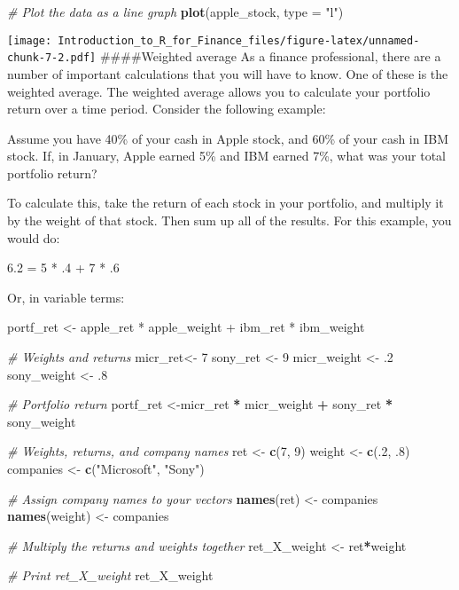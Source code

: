 \documentclass[]{article}
\newenvironment{Shaded}{\begin{snugshade}}{\end{snugshade}}
\newcommand{\KeywordTok}[1]{\textcolor[rgb]{0.13,0.29,0.53}{\textbf{#1}}}
\newcommand{\DataTypeTok}[1]{\textcolor[rgb]{0.13,0.29,0.53}{#1}}
\newcommand{\DecValTok}[1]{\textcolor[rgb]{0.00,0.00,0.81}{#1}}
\newcommand{\StringTok}[1]{\textcolor[rgb]{0.31,0.60,0.02}{#1}}
\newcommand{\CommentTok}[1]{\textcolor[rgb]{0.56,0.35,0.01}{\textit{#1}}}
\newcommand{\OperatorTok}[1]{\textcolor[rgb]{0.81,0.36,0.00}{\textbf{#1}}}
\newcommand{\NormalTok}[1]{#1}
\begin{document}
\begin{Shaded}
\begin{Highlighting}[]
\CommentTok{# Plot the data as a line graph}
\KeywordTok{plot}\NormalTok{(apple_stock, }\DataTypeTok{type =} \StringTok{"l"}\NormalTok{)}
\end{Highlighting}
\end{Shaded}

\texttt{[image: Introduction\_to\_R\_for\_Finance\_files/figure-latex/unnamed-chunk-7-2.pdf]}
\#\#\#\#Weighted average As a finance professional, there are a number
of important calculations that you will have to know. One of these is
the weighted average. The weighted average allows you to calculate your
portfolio return over a time period. Consider the following example:

Assume you have 40\% of your cash in Apple stock, and 60\% of your cash
in IBM stock. If, in January, Apple earned 5\% and IBM earned 7\%, what
was your total portfolio return?

To calculate this, take the return of each stock in your portfolio, and
multiply it by the weight of that stock. Then sum up all of the results.
For this example, you would do:

6.2 = 5 * .4 + 7 * .6

Or, in variable terms:

portf\_ret \textless{}- apple\_ret * apple\_weight + ibm\_ret *
ibm\_weight

\begin{Shaded}
\begin{Highlighting}[]
\CommentTok{# Weights and returns}
\NormalTok{micr_ret<-}\StringTok{ }\DecValTok{7}
\NormalTok{sony_ret <-}\StringTok{ }\DecValTok{9}
\NormalTok{micr_weight <-}\StringTok{ }\NormalTok{.}\DecValTok{2}
\NormalTok{sony_weight <-}\StringTok{ }\NormalTok{.}\DecValTok{8}

\CommentTok{# Portfolio return}
\NormalTok{portf_ret <-micr_ret }\OperatorTok{*}\StringTok{ }\NormalTok{micr_weight }\OperatorTok{+}\StringTok{ }\NormalTok{sony_ret }\OperatorTok{*}\StringTok{ }\NormalTok{sony_weight}


\CommentTok{# Weights, returns, and company names}
\NormalTok{ret <-}\StringTok{ }\KeywordTok{c}\NormalTok{(}\DecValTok{7}\NormalTok{, }\DecValTok{9}\NormalTok{)}
\NormalTok{weight <-}\StringTok{ }\KeywordTok{c}\NormalTok{(.}\DecValTok{2}\NormalTok{, .}\DecValTok{8}\NormalTok{)}
\NormalTok{companies <-}\StringTok{ }\KeywordTok{c}\NormalTok{(}\StringTok{"Microsoft"}\NormalTok{, }\StringTok{"Sony"}\NormalTok{)}

\CommentTok{# Assign company names to your vectors}
\KeywordTok{names}\NormalTok{(ret) <-}\StringTok{ }\NormalTok{companies}
\KeywordTok{names}\NormalTok{(weight) <-}\StringTok{ }\NormalTok{companies}

\CommentTok{# Multiply the returns and weights together }
\NormalTok{ret_X_weight <-}\StringTok{ }\NormalTok{ret}\OperatorTok{*}\NormalTok{weight}

\CommentTok{# Print ret_X_weight}
\NormalTok{ret_X_weight}
\end{Highlighting}
\end{Shaded}
\end{document}
